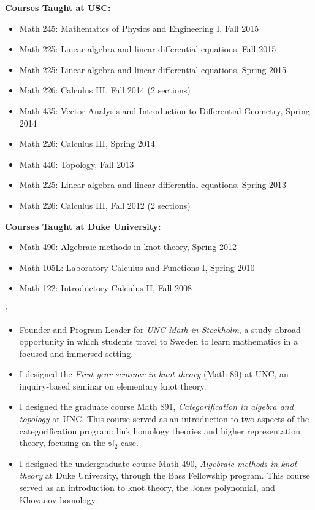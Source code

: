 \documentclass[10pt]{article}
\begin{document}
\smallskip
\noindent\textbf{Courses Taught at USC:}
\begin{itemize}
\item Math 245: Mathematics of Physics and Engineering I, Fall 2015
\item Math 225: Linear algebra and linear differential equations, Fall 2015
\item Math 225: Linear algebra and linear differential equations, Spring 2015 
\item Math 226: Calculus III, Fall 2014 (2 sections)
\item Math 435: Vector Analysis and Introduction to Differential Geometry, Spring 2014
\item Math 226: Calculus III, Spring 2014
\item Math 440: Topology, Fall 2013
\item Math 225: Linear algebra and linear differential equations, Spring 2013
\item Math 226: Calculus III, Fall 2012 (2 sections)
\end{itemize}

\smallskip
\noindent\textbf{Courses Taught at Duke University:}
\begin{itemize}
\item Math 490: Algebraic methods in knot theory, Spring 2012
\item Math 105L: Laboratory Calculus and Functions I, Spring 2010
\item Math 122: Introductory Calculus II, Fall 2008
\end{itemize}

\smallskip
\newpage
{}:
\begin{itemize}

\item Founder and Program Leader for \emph{UNC Math in Stockholm}, 
a study abroad opportunity in which students travel to Sweden to learn mathematics in 
a focused and immersed setting.

\item I designed the {\it First year seminar in knot theory} (Math 89) at UNC, 
an inquiry-based seminar on elementary knot theory.

\item I designed the graduate course Math 891, {\it Categorification in algebra and topology} at UNC. 
This course served as an introduction to two aspects of the categorification program: link homology theories and higher representation theory, 
focusing on the $\mathfrak{sl}_2$ case.

\item I designed the undergraduate course Math 490, {\it Algebraic methods in knot theory} at Duke University, through the Bass Fellowship
program. This course served as an introduction to knot theory, the Jones polynomial, and Khovanov homology.
\end{itemize}
\end{document}
